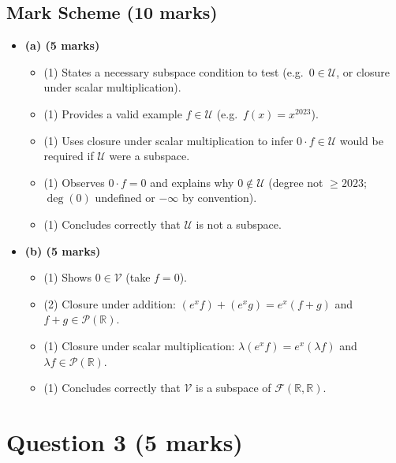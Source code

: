 \documentclass[12pt]{article}
\begin{document}
\subsection{Mark Scheme (10 marks)}
\begin{itemize}[leftmargin=1.6em]
  \item \textbf{(a) (5 marks)}
  \begin{itemize}[leftmargin=1.6em]
    \item (1) States a necessary subspace condition to test (e.g.\ $0\in\mathcal{U}$, or closure under scalar multiplication).
    \item (1) Provides a valid example $f\in\mathcal{U}$ (e.g.\ $f(x)=x^{2023}$).
    \item (1) Uses closure under scalar multiplication to infer $0\cdot f\in\mathcal{U}$ would be required if $\mathcal{U}$ were a subspace.
    \item (1) Observes $0\cdot f=0$ and explains why $0\notin\mathcal{U}$ (degree not $\ge 2023$; $\deg(0)$ undefined or $-\infty$ by convention).
    \item (1) Concludes correctly that $\mathcal{U}$ is not a subspace.
  \end{itemize}

  \item \textbf{(b) (5 marks)}
  \begin{itemize}[leftmargin=1.6em]
    \item (1) Shows $0\in\mathcal{V}$ (take $f=0$).
    \item (2) Closure under addition: $(e^x f)+(e^x g)=e^x(f+g)$ and $f+g\in\mathcal{P}(\mathbb{R})$.
    \item (1) Closure under scalar multiplication: $\lambda(e^x f)=e^x(\lambda f)$ and $\lambda f\in\mathcal{P}(\mathbb{R})$.
    \item (1) Concludes correctly that $\mathcal{V}$ is a subspace of $\mathcal{F}(\mathbb{R},\mathbb{R})$.
  \end{itemize}
\end{itemize}

\newpage

\section{Question 3 \hfill (5 marks)}
\end{document}

